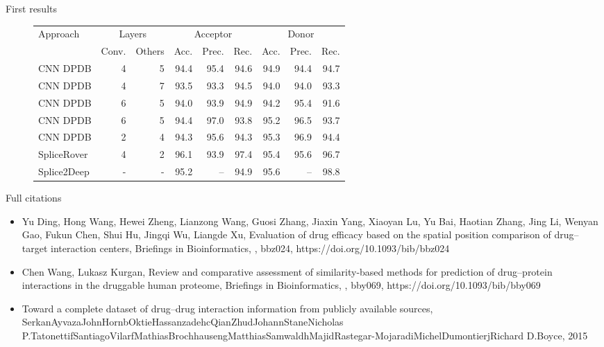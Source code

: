 \documentclass[10pt]{beamer}
\begin{document}
\begin{frame}{First results}
	\begin{figure}
		\small
		\centering
		\begingroup
		\def\arraystretch{1.2}
		\begin{tabular}{|l|r|r|r|r|r|r|r|r|}
			\hline
			Approach  & \multicolumn{2}{c}{Layers} & \multicolumn{3}{|c|}{Acceptor} & \multicolumn{3}{c|}{Donor} \\
			\cline{2-9}
			&Conv. & Others & Acc. & Prec. & Rec. & Acc. & Prec. & Rec. \\
			\hline
			CNN DPDB & 4 & 5 & 94.4 & 95.4 & 94.6 & 94.9 & 94.4 & 94.7 \\
			CNN DPDB & 4 & 7 & 93.5 & 93.3 & 94.5 & 94.0 & 94.0 & 93.3 \\
			CNN DPDB & 6 & 5 & 94.0 & 93.9 & 94.9 & 94.2 & 95.4 & 91.6 \\
			CNN DPDB & 6 & 5 & 94.4 & 97.0 & 93.8 & 95.2 & 96.5 & 93.7 \\
			CNN DPDB & 2 & 4 & 94.3 & 95.6 & 94.3 & 95.3 & 96.9 & 94.4 \\
			SpliceRover & 4 & 2 & 96.1 & 93.9 & 97.4 & 95.4 & 95.6 & 96.7 \\
			Splice2Deep & - & - & 95.2 &  -- & 94.9 & 95.6 & -- & 98.8\\
			
			\hline  
		\end{tabular}
		\endgroup
	\end{figure}
\end{frame}


\begin{frame}{Full citations}
	\footnotesize
	\begin{itemize}
		\item Yu Ding, Hong Wang, Hewei Zheng, Lianzong Wang, Guosi Zhang, Jiaxin Yang, Xiaoyan Lu, Yu Bai, Haotian Zhang, Jing Li, Wenyan Gao, Fukun Chen, Shui Hu, Jingqi Wu, Liangde Xu, Evaluation of drug efficacy based on the spatial position comparison of drug–target interaction centers, Briefings in Bioinformatics, , bbz024, https://doi.org/10.1093/bib/bbz024
		\item Chen Wang, Lukasz Kurgan, Review and comparative assessment of similarity-based methods for prediction of drug–protein interactions in the druggable human proteome, Briefings in Bioinformatics, , bby069, https://doi.org/10.1093/bib/bby069
		\item Toward a complete dataset of drug–drug interaction information from publicly available sources, SerkanAyvazaJohnHornbOktieHassanzadehcQianZhudJohannStaneNicholas P.TatonettifSantiagoVilarfMathiasBrochhausengMatthiasSamwaldhMajidRastegar-MojaradiMichelDumontierjRichard D.Boyce, 2015
		
	\end{itemize}
\end{frame}
\end{document}
